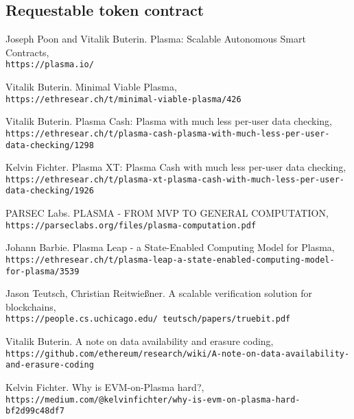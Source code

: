 \documentclass[letterpaper, 11pt]{article}
\begin{document}
\subsection{Requestable token contract} \label{appendix:example-token}


\newpage


\begin{thebibliography}{9}
 \label{plasma-whitepaper}
Joseph Poon and Vitalik Buterin. Plasma: Scalable Autonomous Smart Contracts,
\\\texttt{https://plasma.io/}

Vitalik Buterin. Minimal Viable Plasma,
\\\texttt{https://ethresear.ch/t/minimal-viable-plasma/426}


Vitalik Buterin. Plasma Cash: Plasma with much less per-user data checking,
\\\texttt{https://ethresear.ch/t/plasma-cash-plasma-with-much-less-per-user-data-checking/1298}


Kelvin Fichter. Plasma XT: Plasma Cash with much less per-user data checking,
\\\texttt{https://ethresear.ch/t/plasma-xt-plasma-cash-with-much-less-per-user-data-checking/1926}


PARSEC Labs. PLASMA - FROM MVP TO GENERAL COMPUTATION,
\\\texttt{https://parseclabs.org/files/plasma-computation.pdf}


Johann Barbie. Plasma Leap - a State-Enabled Computing Model for Plasma,
\\\texttt{https://ethresear.ch/t/plasma-leap-a-state-enabled-computing-model-for-plasma/3539}

Jason Teutsch, Christian Reitwießner. A scalable verification solution for blockchains,
\\\texttt{https://people.cs.uchicago.edu/~teutsch/papers/truebit.pdf}

 \label{ref:noteonda}
Vitalik Buterin. A note on data availability and erasure coding,
\\\texttt{https://github.com/ethereum/research/wiki/A-note-on-data-availability-and-erasure-coding}

 \label{ref:evmplasma}
Kelvin Fichter. Why is EVM-on-Plasma hard?,
\\\texttt{https://medium.com/@kelvinfichter/why-is-evm-on-plasma-hard-bf2d99c48df7}


\end{thebibliography}
\end{document}
